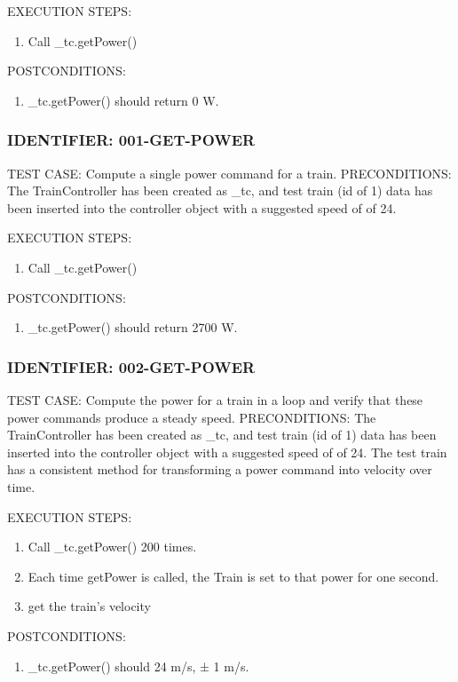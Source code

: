 \documentclass{scrreprt}
\begin{document}
EXECUTION STEPS:
\begin{enumerate}
	\item Call _tc.getPower()
\end{enumerate}
POSTCONDITIONS:
\begin{enumerate}
	\item _tc.getPower() should return 0 W.
\end{enumerate}

\subsubsection{IDENTIFIER: 001-GET-POWER}
TEST CASE: Compute a single power command for a train.
PRECONDITIONS: The TrainController has been created as _tc, and test train (id of 1) data has been inserted into the controller object with a suggested speed of of 24.

EXECUTION STEPS:
\begin{enumerate}
	\item Call _tc.getPower()
\end{enumerate}
POSTCONDITIONS:
\begin{enumerate}
	\item _tc.getPower() should return 2700 W.
\end{enumerate}

\subsubsection{IDENTIFIER: 002-GET-POWER}
TEST CASE: Compute the power for a train in a loop and verify that these power commands produce a steady speed.
PRECONDITIONS: The TrainController has been created as _tc, and test train (id of 1) data has been inserted into the controller object with a suggested speed of of 24.  The test train has a consistent method for transforming a power command into velocity over time.

EXECUTION STEPS:
\begin{enumerate}
	\item Call _tc.getPower() 200 times.
	\item Each time getPower is called, the Train is set to that power for one second.
	\item get the train's velocity
\end{enumerate}
POSTCONDITIONS:
\begin{enumerate}
	\item _tc.getPower() should 24 m/s, ± 1 m/s.
\end{enumerate}
\end{document}
